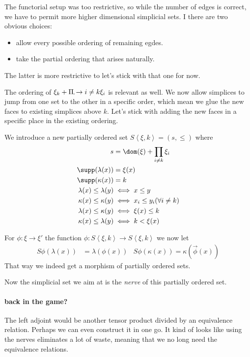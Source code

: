 \documentclass{tac}
\newcommand\of{:}
\newcommand\tuplet[1]{\left\langle #1 \right\rangle}
\newcommand\product[2]{\Pi #1 \mapsto #2}
\begin{document}
The functorial setup was too restrictive, so while the number of edges is correct, we have to permit more higher dimensional simplicial sets.
I there are two obvious choices:
\begin{itemize}
\item allow every possible ordering of remaining egdes.
\item take the partial ordering that arises naturally.
\end{itemize}
The latter is more restrictive to let's stick with that one for now.

The ordering of $\xi_k + \product_{i\neq k}\xi_i$ is relevant as well.
We now allow simplices to jump from one set to the other in a specific order, which mean we glue the new faces to existing simplices above $k$.
Let's stick with adding the new faces in a specific place in the existing ordering.

We introduce a new partially ordered set $S\tuplet{\xi,k} = (s,\leq)$ where
\begin{align*}
s &= \dom(\xi) + \prod_{i\neq k} \xi_i\\
\supp(\lambda(x)) &= \xi(x) \\
\supp(\kappa(x)) &= k\\
\lambda(x) \leq \lambda(y) &\iff x\leq y \\
\kappa(x) \leq \kappa(y) &\iff x_i\leq y_i (\forall i\neq k)\\
\lambda(x)\leq \kappa(y) &\iff \xi(x) \leq k \\
\kappa(x) \leq \lambda(y) &\iff k < \xi(x)
\end{align*}

For $\phi:\xi\to \xi'$ the function $\phi\of S\tuplet{\xi,k} \to S\tuplet{\xi,k}$ we now let
\begin{align*} S\phi(\lambda(x)) &= \lambda(\phi(x)) & S\phi(\kappa(x)) = \kappa(\vec\phi(x)) \end{align*}
That way we indeed get a morphism of partially ordered sets.

Now the simplicial set we aim at is the \emph{nerve} of this partially ordered set.


\paragraph{back in the game?}

The left adjoint would be another tensor product divided by an equivalence relation. Perhaps we can even construct it in one go.
It kind of looks like using the nerves eliminates a lot of waste, meaning that we no long need the equivalence relations.
\end{document}
